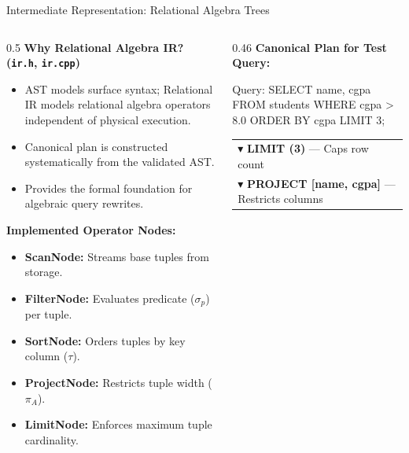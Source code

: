 \documentclass[aspectratio=169,10pt]{beamer}
\begin{document}
\begin{frame}{Intermediate Representation: Relational Algebra Trees}
    \begin{columns}[T]
        \begin{column}{0.5\textwidth}
            \textbf{Why Relational Algebra IR? (\texttt{ir.h}, \texttt{ir.cpp})}
            \begin{itemize}\footnotesize
                \item AST models surface syntax; Relational IR models relational algebra operators independent of physical execution.
                \item Canonical plan is constructed systematically from the validated AST.
                \item Provides the formal foundation for algebraic query rewrites.
            \end{itemize}
            \textbf{Implemented Operator Nodes:}
            \begin{itemize}\footnotesize
                \item \textbf{ScanNode:} Streams base tuples from storage.
                \item \textbf{FilterNode:} Evaluates predicate ($\sigma_p$) per tuple.
                \item \textbf{SortNode:} Orders tuples by key column ($\tau$).
                \item \textbf{ProjectNode:} Restricts tuple width ($\pi_A$).
                \item \textbf{LimitNode:} Enforces maximum tuple cardinality.
            \end{itemize}
        \end{column}
        \begin{column}{0.46\textwidth}
            \textbf{Canonical Plan for Test Query:}
            \begin{block}{}\footnotesize\ttfamily
                Query: SELECT name, cgpa FROM students WHERE cgpa > 8.0 ORDER BY cgpa LIMIT 3;
            \end{block}
            \begin{center}\footnotesize
            \begin{tabular}{|l|}
                \hline
                $\blacktriangledown$ \textbf{LIMIT (3)} --- Caps row count \\
                $\blacktriangledown$ \textbf{PROJECT [name, cgpa]} --- Restricts columns \\

\end{tabular}
\end{center}
\end{column}
\end{columns}
\end{frame}
\end{document}
